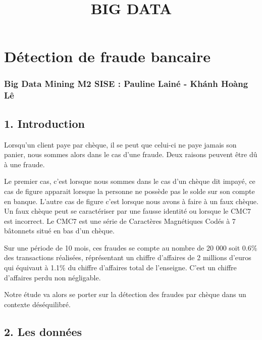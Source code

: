 \documentclass[11pt]{article}
\title{BIG DATA}
\begin{document}
    
    \maketitle
    
    

    
    \hypertarget{duxe9tection-de-fraude-bancaire}{%
\section{Détection de fraude
bancaire}\label{duxe9tection-de-fraude-bancaire}}

\hypertarget{big-data-mining-m2-sise-pauline-lainuxe9---khuxe1nh-houxe0ng-luxea}{%
\subsubsection{Big Data Mining M2 SISE : Pauline Lainé - Khánh Hoàng
Lê}\label{big-data-mining-m2-sise-pauline-lainuxe9---khuxe1nh-houxe0ng-luxea}}

    \hypertarget{introduction}{%
\subsection{1. Introduction}\label{introduction}}

    Lorsqu'un client paye par chèque, il se peut que celui-ci ne paye jamais
son panier, nous sommes alors dans le cas d'une fraude. Deux raisons
peuvent être dû à une fraude.

Le premier cas, c'est lorsque nous sommes dans le cas d'un chèque dit
impayé, ce cas de figure apparait lorsque la personne ne possède pas le
solde sur son compte en banque. L'autre cas de figure c'est lorsque nous
avons à faire à un faux chèque. Un faux chèque peut se caractériser par
une fausse identité ou lorsque le CMC7 est incorrect. Le CMC7 est une
série de Caractères Magnétiques Codés à 7 bâtonnets situé en bas d'un
chèque.

Sur une période de 10 mois, ces fraudes se compte au nombre de 20 000
soit 0.6\% des transactions réalisées, réprésentant un chiffre
d'affaires de 2 millions d'euros qui équivaut à 1.1\% du chiffre
d'affaires total de l'enseigne. C'est un chiffre d'affaires perdu non
négligable.

Notre étude va alors se porter sur la détection des fraudes par chèque
dans un contexte déséquilibré.

    \hypertarget{les-donnuxe9es}{%
\subsection{2. Les données}\label{les-donnuxe9es}}
\end{document}
